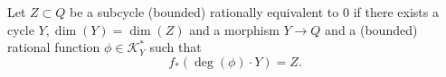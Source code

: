 

    Let $Z\subset Q$ be a subcycle (bounded) rationally equivalent to $0$ if there exists a cycle $Y, \dim(Y)=\dim(Z)$ and a morphism $Y\to Q$ and a (bounded) rational function $\phi\in \mathcal K^*_Y$ such that 
    \[f_*(\deg(\phi)\cdot Y)=Z.\]

